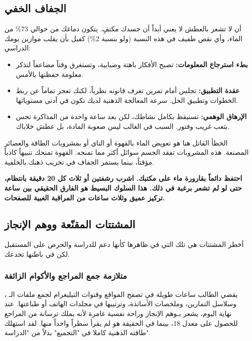 \documentclass[12pt,a4paper]{book}
\newcommand{\importantAr}[1]{%
	\begin{important}
		\bfseries #1
	\end{important}
}
\begin{document}
\subsection{الجفاف الخفي}

أن لا تشعر بالعطش لا يعني أبداً أن جسدك مكتفٍ. يتكون دماغك من حوالي 73\% من الماء، وأي نقص طفيف في هذه النسبة (ولو بنسبة 2\%) كفيل بأن يقلب موازين يومك الدراسي:

\begin{itemize}
	\item \textbf{بطء استرجاع المعلومات:} تصبح الأفكار باهتة وضبابية، وتستغرق وقتاً مضاعفاً لتذكر معلومة حفظتها بالأمس.
	\item \textbf{عقدة التطبيق:} تجلس أمام تمرين تعرف قانونه نظرياً، لكنك تعجز تماماً عن ربط الخطوات وتطبيق الحل. سرعة المعالجة الذهنية لديك تكون في أدنى مستوياتها.
	\item \textbf{الإرهاق الوهمي:} تستيقظ بكامل نشاطك، لكن بعد ساعة واحدة من المذاكرة تحس بتعب غريب وفتور. السبب في الغالب ليس صعوبة المادة، بل عطش خلاياك.
\end{itemize}

الخطأ القاتل هنا هو تعويض الماء بالقهوة أو التاي أو بمشروبات الطاقة والعصائر المصنعة. هذه المشروبات تفقد الجسم سوائل أكثر مما تمنحه. القهوة تمنحك تنبيهاً كاذباً مؤقتاً، بينما يستمر الجفاف في تخريب ذهنك بالخلفية.

\importantAr{احتفظ دائماً بقارورة ماء على مكتبك. اشرب رشفتين أو ثلاث كل 20 دقيقة بانتظام، حتى لو لم تشعر برغبة في ذلك. هذا السلوك البسيط هو الفارق الحقيقي بين ساعة تركيز عميق وثلاث ساعات من المراقبة الغبية للصفحات. }

\subsection{المشتتات المقنّعة ووهم الإنجاز}

أخطر المشتتات هي تلك التي في ظاهرها كأنها دعم للدراسة والحرص على المستقبل لكن في باطنها تخدعك.

\subsubsection{متلازمة جمع المراجع والأكوام الزائفة}
يقضي الطالب ساعات طويلة في تصفح المواقع وقنوات التيليغرام لجمع ملفات الـ ، وسلاسل التمارين، وملخصات الأساتذة، وترتيبها في مجلدات الهاتف أو طباعتها. عند نهاية اليوم، يشعر بـوهم الإنجاز وراحة نفسية غامرة لأنه يملك ترسانة من المراجع للحصول على معدل 18، بينما في الحقيقة هو لم يقرأ سطراً واحداً منها. لقد استهلك طاقته الذهنية كاملا في "التجميع" بدلاً من "الدراسة".
\end{document}
